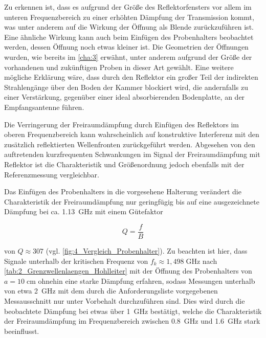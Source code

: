 Zu erkennen ist, dass es aufgrund der Größe des Reflektorfensters vor allem im unteren Frequenzbereich zu einer erhöhten Dämpfung der Transmission kommt, was unter anderem auf die Wirkung der Öffnung als Blende zurückzuführen ist. Eine ähnliche Wirkung kann auch beim Einfügen des Probenhalters beobachtet werden, dessen Öffnung noch etwas kleiner ist. Die Geometrien der Öffnungen wurden, wie bereits im \Kapitel\ref{cha:3} erwähnt, unter anderem aufgrund der Größe der vorhandenen und zukünftigen Proben in dieser Art gewählt. Eine weitere mögliche Erklärung wäre, dass durch den Reflektor ein großer Teil der indirekten Strahlengänge über den Boden der Kammer blockiert wird, die andernfalls zu einer Verstärkung, gegenüber einer ideal absorbierenden Bodenplatte, an der Empfangsantenne führen. 
\par
\vspace{\linespace}
Die Verringerung der Freiraumdämpfung durch Einfügen des Reflektors im oberen Frequenzbereich kann wahrscheinlich auf konstruktive Interferenz mit den zusätzlich reflektierten Wellenfronten zurückgeführt werden. Abgesehen von den auftretenden kurzfrequenten Schwankungen im Signal der Freiraumdämpfung mit Reflektor ist die Charakteristik und Größenordnung jedoch ebenfalls mit der Referenzmessung vergleichbar.
\par
\vspace{\linespace}
Das Einfügen des Probenhalters in die vorgesehene Halterung verändert die Charakteristik der Freiraumdämpfung nur geringfügig bis auf eine ausgezeichnete Dämpfung bei ca. \SI{1,13}{\giga\hertz} mit einem Gütefaktor

\begin{equation}
    Q = \frac{f}{B}
\end{equation}

von $Q \approx 307$ (vgl. \Abb\ref{fig:4_Vergleich_Probenhalter}). Zu beachten ist hier, dass Signale unterhalb der kritischen Frequenz von $f_k \approx 1,498\;\si{\giga\hertz}$ nach \Tabelle\ref{tab:2_Grenzwellenlaengen_Hohlleiter} mit der Öffnung des Probenhalters von $a = 10\;\si{\centi\meter}$ ohnehin eine starke Dämpfung erfahren, sodass Messungen unterhalb von etwa \SI{2}{\giga\hertz} mit dem durch die Anforderungsliste vorgegebenen Messausschnitt nur unter Vorbehalt durchzuführen sind. Dies wird durch die beobachtete Dämpfung bei etwas über \SI{1}{\giga\hertz} bestätigt, welche die Charakteristik der Freiraumdämpfung im Frequenzbereich zwischen \SI{0.8}{\giga\hertz} und \SI{1.6}{\giga\hertz} stark beeinflusst. %
\par
\vspace{\linespace}

